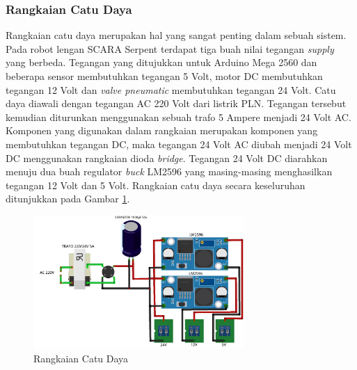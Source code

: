 \subsubsection{Rangkaian Catu Daya}
Rangkaian catu daya merupakan hal yang sangat penting dalam sebuah sistem. Pada robot lengan SCARA Serpent terdapat tiga buah nilai tegangan \textit{supply} yang berbeda. Tegangan yang ditujukkan untuk Arduino Mega 2560 dan beberapa sensor membutuhkan tegangan 5 Volt, motor DC membutuhkan tegangan 12 Volt dan \textit{valve pneumatic} membutuhkan tegangan 24 Volt. Catu daya diawali dengan tegangan AC 220 Volt dari listrik PLN. Tegangan tersebut kemudian diturunkan menggunakan sebuah trafo 5 Ampere menjadi 24 Volt AC. Komponen yang digunakan dalam rangkaian merupakan komponen yang membutuhkan tegangan DC, maka tegangan 24 Volt AC diubah menjadi 24 Volt DC menggunakan rangkaian dioda \textit{bridge}. Tegangan 24 Volt DC diarahkan menuju dua buah regulator \textit{buck} LM2596 yang masing-masing menghasilkan tegangan 12 Volt dan 5 Volt. Rangkaian catu daya secara keseluruhan ditunjukkan pada Gambar \ref{pic.skematikcatu}.
\begin{figure}[H]
	\centering
	\includegraphics[width=8cm]{gambar/catudaya_bb.png}
	\caption{Rangkaian Catu Daya}
	\label{pic.skematikcatu}
\end{figure}
